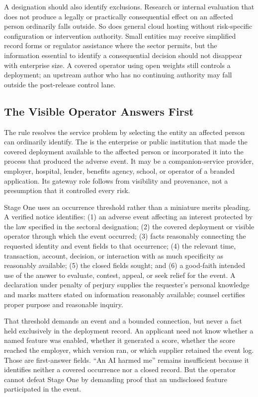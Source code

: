 A designation should also identify exclusions. Research or internal evaluation that does not produce a legally or practically consequential effect on an affected person ordinarily falls outside. So does general cloud hosting without risk-specific configuration or intervention authority. Small entities may receive simplified record forms or regulator assistance where the sector permits, but the information essential to identify a consequential decision should not disappear with enterprise size. A covered operator using open weights still controls a deployment; an upstream author who has no continuing authority may fall outside the post-release control lane.

\subsection{The Visible Operator Answers First}
\label{sec:gateway}

The rule resolves the service problem by selecting the entity an affected person can ordinarily identify. The  is the enterprise or public institution that made the covered deployment available to the affected person or incorporated it into the process that produced the adverse event. It may be a companion-service provider, employer, hospital, lender, benefits agency, school, or operator of a branded application. Its gateway role follows from visibility and provenance, not a presumption that it controlled every risk.

Stage One uses an occurrence threshold rather than a miniature merits pleading. A verified notice identifies: (1) an adverse event affecting an interest protected by the law specified in the sectoral designation; (2) the covered deployment or visible operator through which the event occurred; (3) facts reasonably connecting the requested identity and event fields to that occurrence; (4) the relevant time, transaction, account, decision, or interaction with as much specificity as reasonably available; (5) the closed fields sought; and (6) a good-faith intended use of the answer to evaluate, contest, appeal, or seek relief for the event. A declaration under penalty of perjury supplies the requester's personal knowledge and marks matters stated on information reasonably available; counsel certifies proper purpose and reasonable inquiry.

That threshold demands an event and a bounded connection, but never a fact held exclusively in the deployment record. An applicant need not know whether a named feature was enabled, whether it generated a score, whether the score reached the employer, which version ran, or which supplier retained the event log. Those are first-answer fields. ``An AI harmed me'' remains insufficient because it identifies neither a covered occurrence nor a closed record. But the operator cannot defeat Stage One by demanding proof that an undisclosed feature participated in the event.


